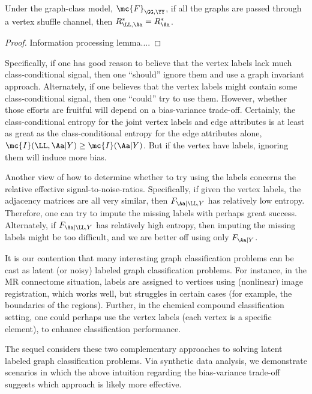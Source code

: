 \documentclass[10pt,journal,cspaper,compsoc]{IEEEtran}
\begin{document}
\begin{thm}
	Under the graph-class model, $\mc{F}_{\GG,\YY}$, if all the graphs are passed through a vertex shuffle channel, then $R^*_{\LL,\Aa}=R^*_{\Aa}$.
\end{thm}
\begin{proof}
Information processing lemma....
\end{proof}

 Specifically, if one has good reason to believe that the vertex labels lack much class-conditional signal, then one ``should'' ignore them and use a graph invariant approach.  Alternately, if one believes that the vertex labels might contain some class-conditional signal, then one ``could'' try to use them.  However, whether those efforts are fruitful will depend on a bias-variance trade-off.  Certainly, the class-conditional entropy for the joint vertex labels and edge attributes is at least as great as the class-conditional entropy for the edge attributes alone, $\mc{I}(\LL,\Aa | Y) \geq \mc{I}(\Aa | Y)$.   But if the vertex have labels, ignoring them will induce more bias.  

Another view of how to determine whether to try using the labels concerns the relative effective signal-to-noise-ratios.  Specifically, if given the vertex labels, the adjacency matrices are all very similar, then $F_{\Aa | \LL, Y}$ has relatively low entropy.  Therefore, one can try to impute the missing labels with perhaps great success.  Alternately, if $F_{\Aa | \LL, Y}$ has relatively high entropy, then imputing the missing labels might be too difficult, and we are better off using only $F_{\Aa | Y}$.

It is our contention that many interesting graph classification problems can be cast as latent (or noisy) labeled graph classification problems.  For instance, in the MR connectome situation, labels are assigned to vertices using (nonlinear) image registration, which works well, but struggles in certain cases (for example, the boundaries of the regions).  Further, in the chemical compound classification setting, one could perhaps use the vertex labels (each vertex is a specific element), to enhance classification performance.  

The sequel considers these two complementary approaches to solving latent labeled graph classification problems. Via synthetic data analysis, we demonstrate scenarios in which the above intuition regarding the bias-variance trade-off suggests which approach is likely more effective.
\end{document}
